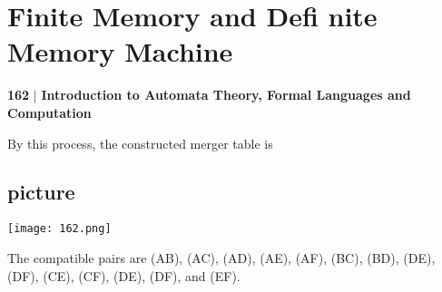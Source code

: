 \documentclass[9pt]{beamer}
\begin{document}
\begin{frame}
\section*{Finite Memory and Defi nite Memory Machine}
 \begin{flushleft}
    \textbf{162}\hspace*{0.1cm} \textbf{$|$} \hspace*{0.1cm} {\tiny \textbf{Introduction to Automata Theory, Formal Languages and Computation}}
  \end{flushleft}
\vspace*{0.4cm}

By this process, the constructed merger table is\\

\vspace*{0.1cm}
\begin{center}
\section{picture}
\texttt{[image: 162.png]}
\end{center}

\vspace*{0.1cm}
\hspace*{0.5cm} The compatible pairs are (AB), (AC), (AD), (AE), (AF), (BC), (BD), (DE), (DF), (CE), (CF), (DE),
(DF), and (EF).\\

\vspace*{0.5cm}
\end{frame}
\end{document}
